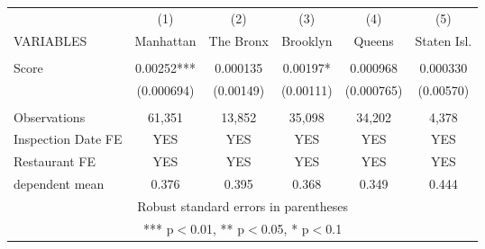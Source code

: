 \begin{tabular}{lccccc} \hline
 & (1) & (2) & (3) & (4) & (5) \\
VARIABLES & Manhattan & The Bronx & Brooklyn & Queens & Staten Isl. \\ \hline
 &  &  &  &  &  \\
Score & 0.00252*** & 0.000135 & 0.00197* & 0.000968 & 0.000330 \\
 & (0.000694) & (0.00149) & (0.00111) & (0.000765) & (0.00570) \\
 &  &  &  &  &  \\
Observations & 61,351 & 13,852 & 35,098 & 34,202 & 4,378 \\
Inspection Date FE & YES & YES & YES & YES & YES \\
Restaurant FE & YES & YES & YES & YES & YES \\
 dependent mean & 0.376 & 0.395 & 0.368 & 0.349 & 0.444 \\ \hline
\multicolumn{6}{c}{ Robust standard errors in parentheses} \\
\multicolumn{6}{c}{ *** p$<$0.01, ** p$<$0.05, * p$<$0.1} \\
\end{tabular}
